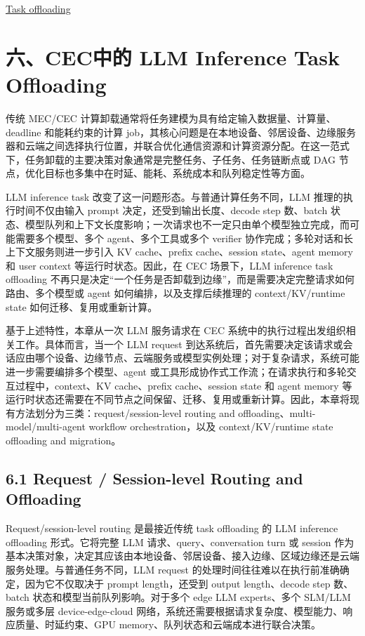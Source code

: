 \documentclass[a4paper,10pt]{ctexart}
\begin{document}
\href{https://tcnh03o5qwao.feishu.cn/docx/Mj3qdPuO7oQCldxARhsc9IkSnBg}{Task offloading}


\section*{六、CEC中的 LLM Inference Task Offloading}

传统 MEC/CEC 计算卸载通常将任务建模为具有给定输入数据量、计算量、deadline 和能耗约束的计算 job，其核心问题是在本地设备、邻居设备、边缘服务器和云端之间选择执行位置，并联合优化通信资源和计算资源分配。在这一范式下，任务卸载的主要决策对象通常是完整任务、子任务、任务链断点或 DAG 节点，优化目标也多集中在时延、能耗、系统成本和队列稳定性等方面。


LLM inference task 改变了这一问题形态。与普通计算任务不同，LLM 推理的执行时间不仅由输入 prompt 决定，还受到输出长度、decode step 数、batch 状态、模型队列和上下文长度影响；一次请求也不一定只由单个模型独立完成，而可能需要多个模型、多个 agent、多个工具或多个 verifier 协作完成；多轮对话和长上下文服务则进一步引入 KV cache、prefix cache、session state、agent memory 和 user context 等运行时状态。因此，在 CEC 场景下，LLM inference task offloading 不再只是决定“一个任务是否卸载到边缘”，而是需要决定完整请求如何路由、多个模型或 agent 如何编排，以及支撑后续推理的 context/KV/runtime state 如何迁移、复用或重新计算。


基于上述特性，本章从一次 LLM 服务请求在 CEC 系统中的执行过程出发组织相关工作。具体而言，当一个 LLM request 到达系统后，首先需要决定该请求或会话应由哪个设备、边缘节点、云端服务或模型实例处理；对于复杂请求，系统可能进一步需要编排多个模型、agent 或工具形成协作式工作流；在请求执行和多轮交互过程中，context、KV cache、prefix cache、session state 和 agent memory 等运行时状态还需要在不同节点之间保留、迁移、复用或重新计算。因此，本章将现有方法划分为三类：request/session-level routing and offloading、multi-model/multi-agent workflow orchestration，以及 context/KV/runtime state offloading and migration。




\subsection*{6.1 Request / Session-level Routing and Offloading}

Request/session-level routing 是最接近传统 task offloading 的 LLM inference offloading 形式。它将完整 LLM 请求、query、conversation turn 或 session 作为基本决策对象，决定其应该由本地设备、邻居设备、接入边缘、区域边缘还是云端服务处理。与普通任务不同，LLM request 的处理时间往往难以在执行前准确确定，因为它不仅取决于 prompt length，还受到 output length、decode step 数、batch 状态和模型当前队列影响。对于多个 edge LLM experts、多个 SLM/LLM 服务或多层 device-edge-cloud 网络，系统还需要根据请求复杂度、模型能力、响应质量、时延约束、GPU memory、队列状态和云端成本进行联合决策。
\end{document}
